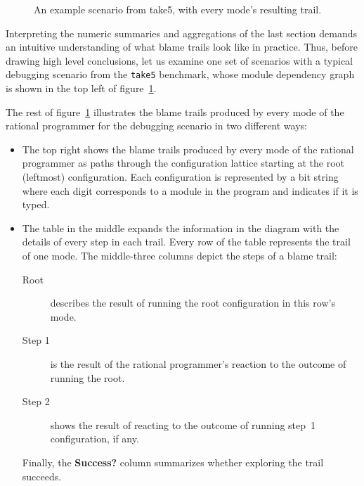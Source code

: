 
\begin{figure}

\caption{An example scenario from take5, with every mode's resulting trail.}
\label{fig:example-trails}
\end{figure}

Interpreting the numeric summaries and aggregations of the last section demands an intuitive understanding of what blame trails look like in practice.
Thus, before drawing high level conclusions, let us examine one set of scenarios with a typical debugging scenario from the {\tt take5} benchmark,
whose module dependency graph is shown in the top left of figure~\ref{fig:example-trails}.

The rest of figure~\ref{fig:example-trails} illustrates the blame trails produced by every mode of the rational programmer for the debugging scenario in
two different ways: 
\begin{itemize}

\item The top right shows the blame trails produced by every mode of the rational programmer as paths through the configuration lattice starting at the
root (leftmost) configuration. Each configuration is represented by a bit string where each digit corresponds to a module in the program and indicates if
it is typed.

\item The table in the middle expands the information in the diagram with the details of every step in each trail.
Every row of the table represents the trail of one mode. The middle-three columns depict the steps of a blame trail:
\begin{description}
\item[Root] describes the result of running the root configuration in this row's mode.
\item[Step 1] is the result of the rational programmer's reaction to the outcome of running the root. 
\item[Step 2] shows the result of reacting to the outcome of running step~1 configuration, if any. 
\end{description}
Finally, the \textbf{Success?} column summarizes whether exploring the trail succeeds.

\end{itemize}

